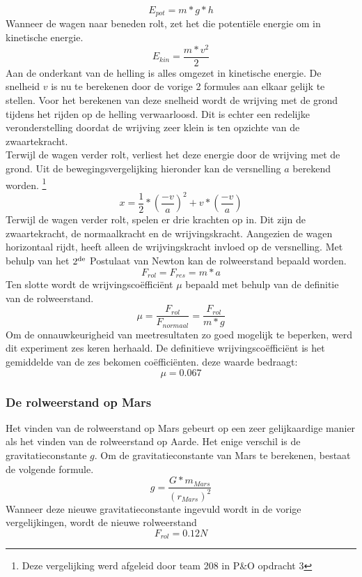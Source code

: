 \begin{equation}
E_{pot}=m*g*h
\end{equation}
Wanneer de wagen naar beneden rolt, zet het die potenti\"ele energie om in kinetische energie.
\begin{equation}
E_{kin}=\frac{m*v^2}{2}
\end{equation}
Aan de onderkant van de helling is alles omgezet in kinetische energie. De snelheid $v$ is nu te berekenen door de vorige 2 formules aan elkaar gelijk te stellen. Voor het berekenen van deze snelheid wordt de wrijving met de grond tijdens het rijden op de helling verwaarloosd. Dit is echter een redelijke veronderstelling doordat de wrijving zeer klein is ten opzichte van de zwaartekracht.\\
Terwijl de wagen verder rolt, verliest het deze energie door de wrijving met de grond. Uit de bewegingsvergelijking hieronder kan de versnelling $a$ berekend worden.
\footnote{Deze vergelijking werd afgeleid door team 208 in P\&O opdracht 3}
\begin{equation}
x=\frac{1}{2}*\left(\frac{-v}{a}\right)^2+v*\left(\frac{-v}{a}\right)
\end{equation}
Terwijl de wagen verder rolt, spelen er drie krachten op in. Dit zijn de zwaartekracht, de normaalkracht en de wrijvingskracht. Aangezien de wagen horizontaal rijdt, heeft alleen de wrijvingskracht invloed op de versnelling. Met behulp van het $2\textsuperscript{de}$ Postulaat van Newton kan de rolweerstand bepaald worden.
\begin{equation}
F_{rol}=F_{res}=m*a
\end{equation}
Ten slotte wordt de wrijvingsco\"effici\"ent $\mu$ bepaald met behulp van de definitie van de rolweerstand.
\begin{equation}
\mu=\frac{F_{rol}}{F_{normaal}}=\frac{F_{rol}}{m*g}
\end{equation}
Om de onnauwkeurigheid van meetresultaten zo goed mogelijk te beperken, werd dit experiment zes keren herhaald. De definitieve wrijvingscoëffici\"ent is het gemiddelde van de zes bekomen coëfficiënten. deze waarde bedraagt:$$\mu=0.067$$
\pagebreak
\subsubsection{De rolweerstand op Mars}
Het vinden van de rolweerstand op Mars gebeurt op een zeer gelijkaardige manier als het vinden van de rolweerstand op Aarde. Het enige verschil is de gravitatieconstante $g$. Om de gravitatieconstante van Mars te berekenen, bestaat de volgende formule.
\begin{equation}
g=\frac{G*m_{Mars}}{\left(r_{Mars}\right)^2}
\end{equation}
Wanneer deze nieuwe gravitatieconstante ingevuld wordt in de vorige vergelijkingen, wordt de nieuwe rolweerstand $$F_{rol}=0.12N$$